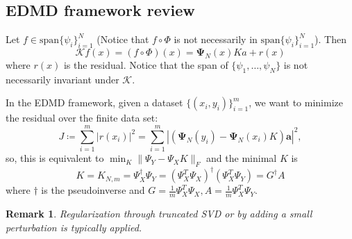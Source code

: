 \documentclass{article}[11]
\newtheorem*{remark}{Remark}
\begin{document}
	\subsection*{EDMD framework review}
	Let $f\in \text{span}\{\psi_i\}_{i=1}^N$ (Notice that $f\circ\Phi$ is not necessarily in $\text{span}\{\psi_i\}_{i=1}^N$). Then 
	$$\mathcal{K} f(x) = (f\circ\Phi)(x) = \mathbf{\Psi}_N(x)K a + r(x)$$
	where $r(x)$ is the residual. Notice that the span of $\{ \psi_1, \dots, \psi_N \}$ is not necessarily invariant under $\mathcal{K}$.
	
	In the EDMD framework, given a dataset $\{(x_i,y_i)\}_{i=1}^m$, we want to minimize the residual over the finite data set:
	$$J \coloneqq \sum_{i=1}^m \left| r(x_i) \right|^2 = \sum_{i=1}^m \left| \left(\mathbf{\Psi}_N(y_i) - \mathbf{\Psi}_N(x_i)K\right)\mathbf{a} \right|^2,$$
	so, this is equivalent to $\min_{K} \| \Psi_Y - \Psi_X K\|_F$ and the minimal $K$ is
	$$K = K_{N,m} = \Psi_X^{\dagger}\Psi_Y = (\Psi_X^T\Psi_X)^{\dagger}(\Psi_X^T\Psi_Y) = G^{\dagger}A$$
	where $\dagger$ is the pseudoinverse and $G=\frac{1}{m}\Psi_X^T\Psi_X, A=\frac{1}{m}\Psi_X^T\Psi_Y$. 
	\begin{remark}
		Regularization through truncated SVD or by adding a small perturbation is typically applied.
	\end{remark}
	
\end{document}
